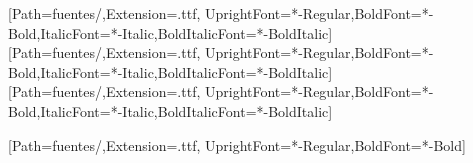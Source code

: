 \geometry{paperwidth=960bp,paperheight=540bp}
\setlength{\parindent}{0pt}
\setlength{\parskip}{0pt}
\setlength{\emergencystretch}{1em}

\newif\ifFuentesMicrosoft
\FuentesMicrosoftfalse
\ifFuentesMicrosoft
  \newfontfamily\FuenteArial{Arial}
  \newfontfamily\FuenteCalibri{Calibri}
  \setsansfont{Calibri}
\else
  \newfontfamily{}[Path=fuentes/,Extension=.ttf,
    UprightFont=*-Regular,BoldFont=*-Bold,ItalicFont=*-Italic,BoldItalicFont=*-BoldItalic]
  \newfontfamily{}[Path=fuentes/,Extension=.ttf,
    UprightFont=*-Regular,BoldFont=*-Bold,ItalicFont=*-Italic,BoldItalicFont=*-BoldItalic]
  \setsansfont{Carlito}[Path=fuentes/,Extension=.ttf,
    UprightFont=*-Regular,BoldFont=*-Bold,ItalicFont=*-Italic,BoldItalicFont=*-BoldItalic]
\fi
\newfontfamily{}[Path=fuentes/,Extension=.ttf,
  UprightFont=*-Regular,BoldFont=*-Bold]

